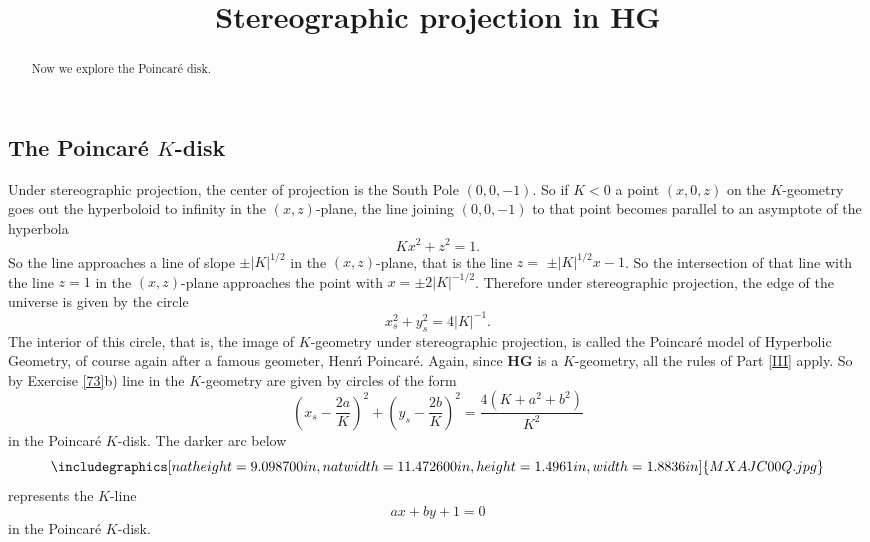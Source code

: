 \documentclass{ximera}
\title{Stereographic projection in \textbf{HG}}
\begin{document}
\begin{abstract}
Now we explore the Poincar\'e disk.
\end{abstract}
\maketitle

\subsection*{The Poincar\'{e} $K$-disk}

Under stereographic projection, the center of projection is the South Pole
$\left(  0,0,-1\right)  $. So if $K<0$ a point $\left(  x,0,z\right)  $ on the
$K$-geometry goes out the hyperboloid to infinity in the $\left(  x,z\right)
$-plane, the line joining $\left(  0,0,-1\right)  $ to that point becomes
parallel to an asymptote of the hyperbola%
\[
Kx^{2}+z^{2}=1.
\]
So the line approaches a line of slope $\pm\left\vert K\right\vert ^{1/2}$ in
the $\left(  x,z\right)  $-plane, that is the line $z=$ $\pm\left\vert
K\right\vert ^{1/2}x-1$. So the intersection of that line with the line $z=1$
in the $\left(  x,z\right)  $-plane approaches the point with $x=\pm
2\left\vert K\right\vert ^{-1/2}$. Therefore under stereographic projection,
the edge of the universe is given by the circle%
\[
x_{s}^{2}+y_{s}^{2}=4\left\vert K\right\vert ^{-1}.
\]
The interior of this circle, that is, the image of $K$-geometry under
stereographic projection, is called the Poincar\'{e} model of Hyperbolic
Geometry, of course again after a famous geometer, Henr\'{\i} Poincar\'{e}.
Again, since \textbf{HG} is a $K$-geometry, all the rules of Part \ref{III}
apply. So by Exercise \ref{73}b) line in the $K$-geometry are given by circles
of the form%
\[
\left(  x_{s}-\frac{2a}{K}\right)  ^{2}+\left(  y_{s}-\frac{2b}{K}\right)
^{2}=\frac{4\left(  K+a^{2}+b^{2}\right)  }{K^{2}}%
\]
in the Poincar\'{e} $K$-disk. The darker arc below%
\begin{equation}%
{\includegraphics[
natheight=9.098700in,
natwidth=11.472600in,
height=1.4961in,
width=1.8836in
]%
{MXAJC00Q.jpg}%
}%
\label{92}%
\end{equation}
represents the $K$-line%
\[
ax+by+1=0
\]
in the Poincar\'{e} $K$-disk. 
\end{document}
